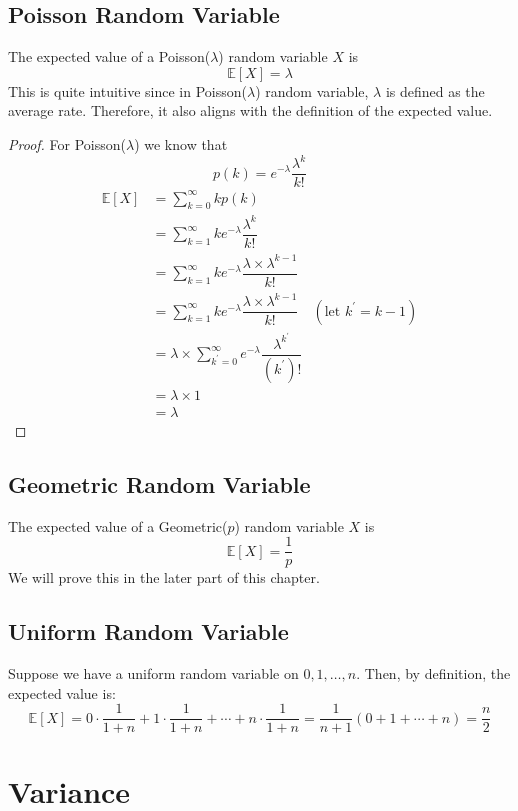 \subsection{Poisson Random Variable}
The expected value of a Poisson(\(\lambda\)) random variable \(X\) is 
\[
    \mathbb{E}[X] = \lambda
\]
This is quite intuitive since in Poisson(\(\lambda\)) random variable, \(\lambda\) is defined as the average rate. Therefore, it also aligns with the definition of the expected value. 
\begin{proof}
    For Poisson(\(\lambda\)) we know that 
    \[
        p(k) = e^{-\lambda}\dfrac{\lambda^k}{k!}
    \]
    \[
        \begin{aligned}
        \mathbb{E}[X] &= \sum_{k = 0}^{\infty} kp(k) \\
        &= \sum_{k = 1}^{\infty} ke^{-\lambda}\dfrac{\lambda^k}{k!} \\
        &= \sum_{k = 1}^{\infty} ke^{-\lambda}\dfrac{\lambda \times \lambda^{k-1}}{k!} \\
        &= \sum_{k = 1}^{\infty} ke^{-\lambda}\dfrac{\lambda \times \lambda^{k-1}}{k!} \quad (\text{let } k^{\prime} = k - 1)\\
        &= \lambda \times \sum_{k^{\prime} = 0}^{\infty} e^{-\lambda}\dfrac{\lambda^{k^{\prime}}}{(k^{\prime})!}\\
        &= \lambda \times 1\\
        &= \lambda
    \end{aligned}
    \]
\end{proof}

\subsection{Geometric Random Variable}
The expected value of a Geometric(\(p\)) random variable \(X\) is 
\[
    \mathbb{E}[X] = \dfrac{1}{p}
\]
We will prove this in the later part of this chapter.

\subsection{Uniform Random Variable}
Suppose we have a uniform random variable on \(0, 1, \dots, n\). Then, by definition, the expected value is:
\[
    \mathbb{E}[X] = 0 \cdot \dfrac{1}{1 + n} + 1 \cdot \dfrac{1}{1 + n} + \cdots + n \cdot \dfrac{1}{1 + n} = \dfrac{1}{n + 1}(0 + 1 + \cdots + n) = \dfrac{n}{2}
\] 

\section{Variance}
